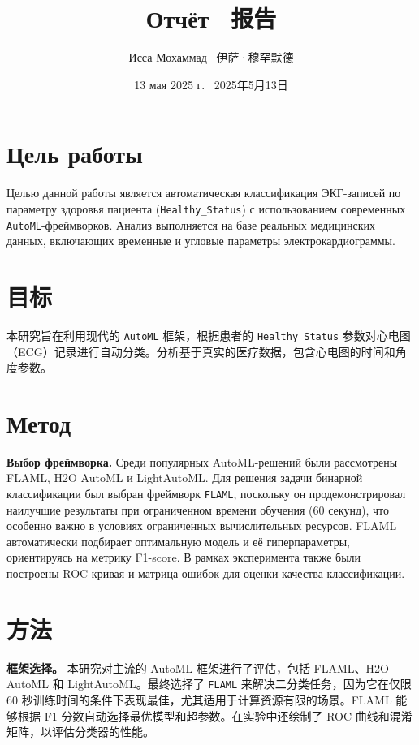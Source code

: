 \documentclass{article}
\title{Отчёт  \ \large 报告}
\author{Исса Мохаммад \ 伊萨·穆罕默德}
\date{13 мая 2025 г. \ 2025年5月13日}
\providecommand{\pcsync}{\par\vspace{\baselineskip}}
\begin{document}
\maketitle

\begin{paracol}{2}
\setlength{\columnsep}{20pt}
\setlength{\emergencystretch}{3em}

\section{Цель работы}
\pcsync
Целью данной работы является автоматическая классификация ЭКГ-записей по параметру здоровья пациента (\texttt{Healthy\_Status}) с использованием современных \texttt{AutoML}-фреймворков. Анализ выполняется на базе реальных медицинских данных, включающих временные и угловые параметры электрокардиограммы.
\switchcolumn %

\section{目标}
\pcsync 
本研究旨在利用现代的 \texttt{AutoML} 框架，根据患者的 \texttt{Healthy\_Status} 参数对心电图（ECG）记录进行自动分类。分析基于真实的医疗数据，包含心电图的时间和角度参数。

\switchcolumn* %

\section{Метод}
\pcsync
\textbf{Выбор фреймворка.} Среди популярных AutoML-решений были рассмотрены FLAML, H2O AutoML и LightAutoML. Для решения задачи бинарной классификации был выбран фреймворк \texttt{FLAML}, поскольку он продемонстрировал наилучшие результаты при ограниченном времени обучения (60 секунд), что особенно важно в условиях ограниченных вычислительных ресурсов. FLAML автоматически подбирает оптимальную модель и её гиперпараметры, ориентируясь на метрику F1-score. В рамках эксперимента также были построены ROC-кривая и матрица ошибок для оценки качества классификации.

\switchcolumn

\section{方法}
\pcsync
\textbf{框架选择。} 本研究对主流的 AutoML 框架进行了评估，包括 FLAML、H2O AutoML 和 LightAutoML。最终选择了 \texttt{FLAML} 来解决二分类任务，因为它在仅限 60 秒训练时间的条件下表现最佳，尤其适用于计算资源有限的场景。FLAML 能够根据 F1 分数自动选择最优模型和超参数。在实验中还绘制了 ROC 曲线和混淆矩阵，以评估分类器的性能。


\end{paracol}
\end{document}
